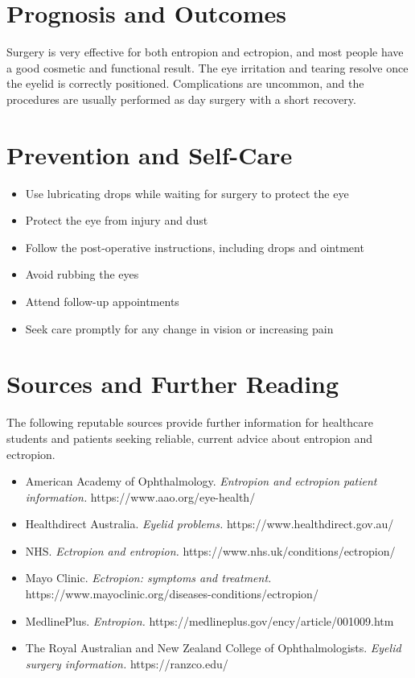 \section*{Prognosis and Outcomes}
Surgery is very effective for both entropion and ectropion, and most people have a good cosmetic and functional result. The eye irritation and tearing resolve once the eyelid is correctly positioned. Complications are uncommon, and the procedures are usually performed as day surgery with a short recovery.

\section*{Prevention and Self-Care}
\begin{itemize}
    \item Use lubricating drops while waiting for surgery to protect the eye
    \item Protect the eye from injury and dust
    \item Follow the post-operative instructions, including drops and ointment
    \item Avoid rubbing the eyes
    \item Attend follow-up appointments
    \item Seek care promptly for any change in vision or increasing pain
\end{itemize}

\section*{Sources and Further Reading}
The following reputable sources provide further information for healthcare students and patients seeking reliable, current advice about entropion and ectropion.
\begin{itemize}
    \item American Academy of Ophthalmology. \textit{Entropion and ectropion patient information.} https://www.aao.org/eye-health/
    \item Healthdirect Australia. \textit{Eyelid problems.} https://www.healthdirect.gov.au/
    \item NHS. \textit{Ectropion and entropion.} https://www.nhs.uk/conditions/ectropion/
    \item Mayo Clinic. \textit{Ectropion: symptoms and treatment.} https://www.mayoclinic.org/diseases-conditions/ectropion/
    \item MedlinePlus. \textit{Entropion.} https://medlineplus.gov/ency/article/001009.htm
    \item The Royal Australian and New Zealand College of Ophthalmologists. \textit{Eyelid surgery information.} https://ranzco.edu/
\end{itemize}
